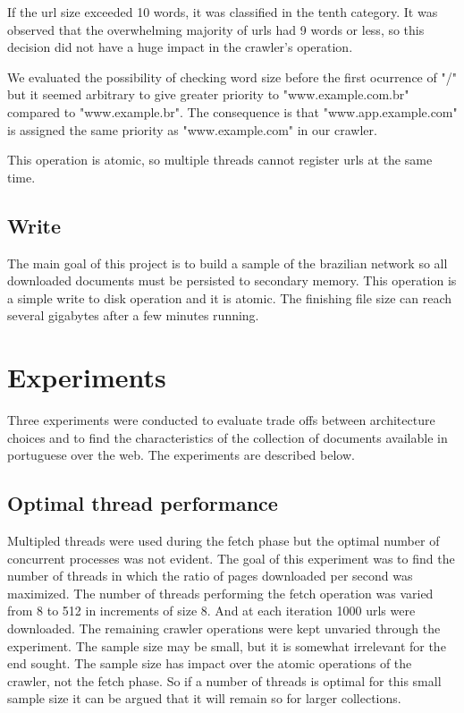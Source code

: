 \documentclass{acmart}
\begin{document}
If the url size exceeded 10 words, it was classified in the tenth category. It was observed that
the overwhelming majority of urls had 9 words or less, so this decision did not have a huge impact 
in the crawler's operation.

We evaluated the possibility of checking word size before the first ocurrence of "/" but it seemed
arbitrary to give greater priority to "www.example.com.br" compared to "www.example.br". The consequence
is that "www.app.example.com" is assigned the same priority as "www.example.com" in our crawler.

This operation is atomic, so multiple threads cannot register urls at the same time.

\subsection{Write}

The main goal of this project is to build a sample of the brazilian network so all downloaded documents must be 
persisted to secondary memory. This operation is a simple write to disk operation and it is atomic. The finishing
file size can reach several gigabytes after a few minutes running.

\section{Experiments}

Three experiments were conducted to evaluate trade offs between architecture choices and 
to find the characteristics of the collection of documents available in portuguese over the web. The
experiments are described below.

\subsection{Optimal thread performance}
Multipled threads were used during the fetch phase but the optimal number of concurrent processes was
not evident. The goal of this experiment was to find the number of threads in which the ratio
of pages downloaded per second was maximized.
The number of threads performing the fetch operation was varied from 8 to 512 in increments of size 8. And at
each iteration 1000 urls were downloaded. The remaining crawler operations were kept unvaried through the 
experiment.
The sample size may be small, but it is somewhat irrelevant for the end sought. The sample size has impact
over the atomic operations of the crawler, not the fetch phase. So if a number of threads is optimal for
this small sample size it can be argued that it will remain so for larger collections.
\end{document}
